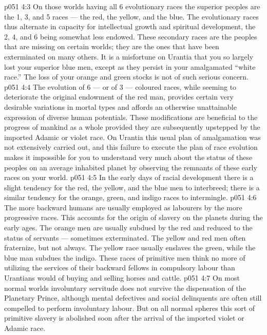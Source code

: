 \vs p051 4:3 On those worlds having all 6 evolutionary races the superior peoples are the 1, 3, and 5 races --- the red, the yellow, and the blue. The evolutionary races thus alternate in capacity for intellectual growth and spiritual development, the 2, 4, and 6 being somewhat less endowed. These secondary races are the peoples that are missing on certain worlds; they are the ones that have been exterminated on many others. It is a misfortune on Urantia that you so largely lost your superior blue men, except as they persist in your amalgamated “white race.” The loss of your orange and green stocks is not of such serious concern.
\vs p051 4:4 The evolution of 6 --- or of 3 --- coloured races, while seeming to deteriorate the original endowment of the red man, provides certain very desirable variations in mortal types and affords an otherwise unattainable expression of diverse human potentials. These modifications are beneficial to the progress of mankind as a whole provided they are subsequently upstepped by the imported Adamic or violet race. On Urantia this usual plan of amalgamation was not extensively carried out, and this failure to execute the plan of race evolution makes it impossible for you to understand very much about the status of these peoples on an average inhabited planet by observing the remnants of these early races on your world.
\vs p051 4:5 \pc In the early days of racial development there is a slight tendency for the red, the yellow, and the blue men to interbreed; there is a similar tendency for the orange, green, and indigo races to intermingle.
\vs p051 4:6 The more backward humans are usually employed as labourers by the more progressive races. This accounts for the origin of slavery on the planets during the early ages. The orange men are usually subdued by the red and reduced to the status of servants --- sometimes exterminated. The yellow and red men often fraternize, but not always. The yellow race usually enslaves the green, while the blue man subdues the indigo. These races of primitive men think no more of utilizing the services of their backward fellows in compulsory labour than Urantians would of buying and selling horses and cattle.
\vs p051 4:7 On most normal worlds involuntary servitude does not survive the dispensation of the Planetary Prince, although mental defectives and social delinquents are often still compelled to perform involuntary labour. But on all normal spheres this sort of primitive slavery is abolished soon after the arrival of the imported violet or Adamic race.
